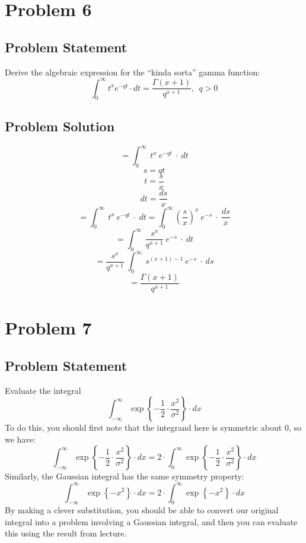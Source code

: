 \documentclass[12pt]{article}
\theoremstyle{definition}
\begin{document}
\newpage
\section*{Problem 6}

\subsection*{Problem Statement}

Derive the  algebraic expression for the ``kinda sorta'' gamma function:
$$
\int_0^\infty t^x e^{-qt} \cdot dt = \frac{\Gamma(x+1)}{q^{x+1}},\ \ q > 0
$$



\subsection*{Problem Solution}

$$ = \int_0^\infty \ t^x \ e^{-qt} \ \cdot \ dt $$
$$ s = qt $$
$$ t = \frac{s}{x} $$
$$ dt = \frac{ds}{x} $$
$$ = \int_0^\infty \ t^x \ e^{-qt} \ \cdot \ dt = \int_0^\infty (\frac{s}{x})^x \ e^{-s} \ \cdot \ \frac{ds}{x} $$
$$ = \int_0^\infty \ \frac{s^x}{q^{x+1}} \ e^{-s} \ \cdot \ dt $$
$$ = \frac{s^x}{q^{x+1}} \ \int_0^\infty \ s^{(x+1) - 1} \ e^{-s} \ \cdot \ ds $$
$$ = \frac{\Gamma(x+1)}{q^{x+1}} $$

\newpage
\section*{Problem 7}

\subsection*{Problem Statement}

Evaluate the integral
$$
\int_{-\infty}^\infty \exp \left \{ - \frac{1}{2}  \cdot  \frac{x^2}{\sigma^2} \right \} \cdot dx
$$
To do this, you should first note that the integrand here is symmetric about $0$, so we have:
$$
\int_{-\infty}^\infty \exp \left \{ - \frac{1}{2}  \cdot  \frac{x^2}{\sigma^2} \right \} \cdot dx = 2 \cdot \int_0^\infty \exp \left \{ - \frac{1}{2}  \cdot  \frac{x^2}{\sigma^2} \right \} \cdot dx
$$
Similarly, the Gaussian integral has the same symmetry property:
$$
\int_{-\infty}^\infty \exp \left \{ - x^2 \right \} \cdot dx = 2 \cdot \int_0^\infty \exp \left \{ - x^2 \right \} \cdot dx
$$
By making a clever substitution, you should be able to convert our original integral into a problem involving a Gaussian integral, and then you can evaluate this using the result from lecture.
\end{document}
